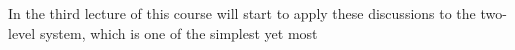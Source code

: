 In the third lecture of this course will start to apply these discussions to the two-level system, which is one of the simplest yet most 